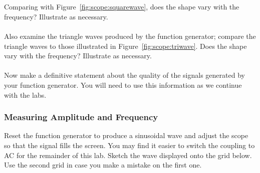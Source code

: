   \\
\\
 \hspace*{0.5cm} Comparing with 
Figure~\ref{fig:scope:squarewave}, does the shape vary with the frequency?
Illustrate as necessary. \\
\vspace*{2cm} \\  
 \hspace*{0.5cm}Also examine the triangle waves
produced by the function generator; compare the triangle waves to those
illustrated in Figure~\ref{fig:scope:triwave}.  Does the shape vary with the
frequency? Illustrate as necessary. \\
\vspace*{2cm} \\   
 \hspace*{0.5cm}  Now make a definitive statement
about the quality of the signals generated by your function generator.  You
will need to use this information as we continue with the labs. \\  

\subsubsection{Measuring Amplitude and Frequency}
\label{sec:scope:measampfreq}

Reset the function generator to produce a sinusoidal wave and adjust the scope
so that the signal fills the screen. You may find it easier to switch the
coupling to AC for the remainder of this lab.  Sketch the wave displayed onto
the grid below.  Use the second grid in case you make a mistake on the first
one.

